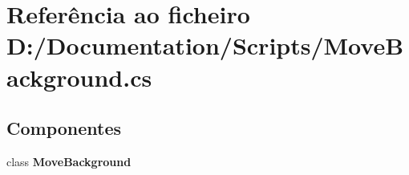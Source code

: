 \section{Referência ao ficheiro D\+:/\+Documentation/\+Scripts/\+Move\+Background.cs}
\label{_move_background_8cs}
\subsection*{Componentes}
\begin{DoxyCompactItemize}
\item 
class \textbf{ Move\+Background}
\end{DoxyCompactItemize}
